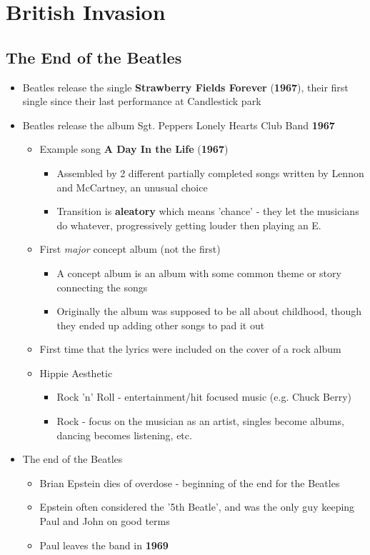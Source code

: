 \documentclass[11pt]{report}
\newcommand{\imp}[1]{\textbf{#1}}
\newcommand{\idate}[2]{\textcolor{blue!50}{\imp{#1}}\label{date:#2}}
\newcommand{\bl}{\begin{itemize}}
\newcommand{\kl}{\end{itemize}}
\newcommand{\song}[2]{\textcolor{red!70}{\textbf{#1}} (\idate{#2}{#1})}
\begin{document}
\chapter{British Invasion}
\section{The End of the Beatles}
\begin{itemize}
	\item Beatles release the single \song{Strawberry Fields Forever}{1967}, their first single since their last performance at Candlestick park
	\item Beatles release the album Sgt. Peppers Lonely Hearts Club Band \idate{1967}{sgt-peppers}
	\bl
		\item Example song \song{A Day In the Life}{1967}
		\bl
			\item Assembled by 2 different partially completed songs written by Lennon and McCartney, an unusual choice
			\item Transition is \textbf{aleatory} which means 'chance' - they let the musicians do whatever, progressively getting louder then playing an E.
		\kl
		\item First \textit{major} concept album (not the first)
		\bl
			\item A concept album is an album with some common theme or story connecting the songs
			\item Originally the album was supposed to be all about childhood, though they ended up adding other songs to pad it out
		\kl
		\item First time that the lyrics were included on the cover of a rock album
		\item Hippie Aesthetic
		\bl
			\item Rock 'n' Roll - entertainment/hit focused music (e.g. Chuck Berry)
			\item Rock - focus on the musician as an artist, singles become albums, dancing becomes listening, etc.
		\kl
	\kl
	\item The end of the Beatles
		\bl
			\item Brian Epstein dies of overdose - beginning of the end for the Beatles
			\item Epstein often considered the '5th Beatle', and was the only guy keeping Paul and John on good terms
			\item Paul leaves the band in \idate{1969}{beatles-end}
		\kl
\end{itemize}
\end{document}
